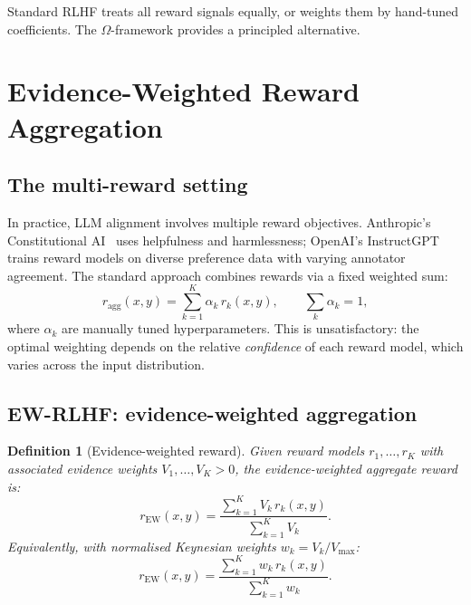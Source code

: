 \documentclass[11pt,a4paper]{article}
\newtheorem{definition}[theorem]{Definition}
\begin{document}
Standard RLHF treats all reward signals equally, or weights them by hand-tuned coefficients. The $\Omega$-framework provides a principled alternative.


\section{Evidence-Weighted Reward Aggregation}
\label{sec:ew-rlhf}

\subsection{The multi-reward setting}

In practice, LLM alignment involves multiple reward objectives. Anthropic's Constitutional AI~\cite{bai2022} uses helpfulness and harmlessness; OpenAI's InstructGPT~\cite{ouyang2022} trains reward models on diverse preference data with varying annotator agreement. The standard approach combines rewards via a fixed weighted sum:
\begin{equation}
\label{eq:standard-combo}
    r_{\mathrm{agg}}(x, y) = \sum_{k=1}^K \alpha_k \, r_k(x, y), \qquad \sum_k \alpha_k = 1,
\end{equation}
where $\alpha_k$ are manually tuned hyperparameters. This is unsatisfactory: the optimal weighting depends on the relative \emph{confidence} of each reward model, which varies across the input distribution.

\subsection{EW-RLHF: evidence-weighted aggregation}

\begin{definition}[Evidence-weighted reward]
\label{def:ew-reward}
Given reward models $r_1, \ldots, r_K$ with associated evidence weights $V_1, \ldots, V_K > 0$, the \emph{evidence-weighted aggregate reward} is:
\begin{equation}
\label{eq:ew-reward}
    r_{\mathrm{EW}}(x, y) = \frac{\sum_{k=1}^K V_k \, r_k(x, y)}{\sum_{k=1}^K V_k}.
\end{equation}
Equivalently, with normalised Keynesian weights $w_k = V_k / V_{\max}$:
\begin{equation}
\label{eq:ew-reward-normalised}
    r_{\mathrm{EW}}(x, y) = \frac{\sum_{k=1}^K w_k \, r_k(x, y)}{\sum_{k=1}^K w_k}.
\end{equation}
\end{definition}
\end{document}
